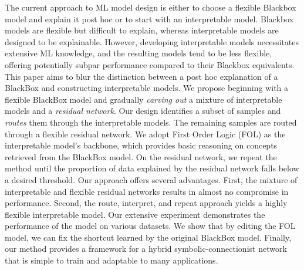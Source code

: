 The current approach to ML model design is either to choose a flexible Blackbox model and explain it post hoc or to start with an interpretable model. 
Blackbox models are flexible but difficult to explain, whereas interpretable models are designed to be explainable. 
However, developing interpretable models necessitates extensive ML knowledge, and the resulting models tend to be less flexible, offering potentially subpar performance compared to their Blackbox equivalents. 
This paper aims to blur the distinction between a post hoc explanation of a BlackBox and constructing interpretable models. 
We propose beginning with a flexible BlackBox model and gradually \emph{carving out} a mixture of interpretable models and a \emph{residual network}. 
Our design identifies a subset of samples and \emph{routes} them through the interpretable models. The remaining samples are routed through a flexible residual network. 
We adopt First Order Logic (FOL) as the interpretable model's backbone, which provides basic reasoning on concepts retrieved from the BlackBox model. 
On the residual network, we repeat the method until the proportion of data explained by the residual network falls below a desired threshold. 
Our approach offers several advantages. First, the mixture of interpretable and flexible residual networks results in almost no compromise in performance. Second, the route, interpret, and repeat approach yields a highly flexible interpretable model. 
Our extensive experiment demonstrates the performance of the model on various datasets. We show that by editing the FOL model, we can fix the shortcut learned by the original BlackBox model. 
Finally, our method provides a framework for a hybrid symbolic-connectionist network that is simple to train and adaptable to many applications.